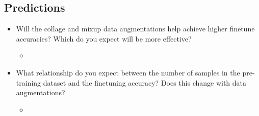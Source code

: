 \documentclass[english,11pt,a4paper,titlepage]{report}
\begin{document}
	\subsection*{Predictions}
	\begin{itemize}
		\item Will the collage and mixup data augmentations help achieve higher finetune accuracies? Which do you expect will be more effective?
		\begin{itemize}
			\item 
		\end{itemize}
		\item What relationship do you expect between the number of samples in the pre-training dataset and the finetuning accuracy? Does this change with data augmentations?
		\begin{itemize}
			\item 
		\end{itemize}
	\end{itemize}
	
	
	
	
\end{document}
